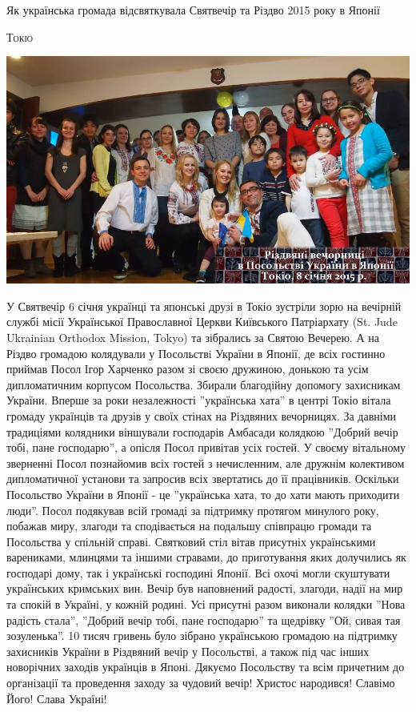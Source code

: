 \documentclass[10pt,a4paper]{article}
\newcommand{\NewsItem}[1]{%
		\usefont{T2A}{iwona}{m}{n} 
		\large #1 \vspace{4pt}
		\par \normalsize \normalfont}
\newcommand{\NewsAuthor}[1]{%
			\hfill \textsc{#1} \vspace{4pt}
			\par \normalfont}
\begin{document}
\begin{multicols}{3}
\vspace{1cm}
\NewsItem{Як українська громада відсвяткувала Святвечір та Різдво 2015 року в Японії}
\NewsAuthor{Токіо}
		\begin{center}
			\includegraphics[width=0.8\linewidth]{images/rizdvo}
		\end{center}
У Святвечір 6 січня українці та японські друзі в Токіо зустріли зорю на вечірній службі місії Української Православної Церкви Київського Патріархату (St. Jude Ukrainian Orthodox Mission, Tokyo) та зібрались за Святою Вечерею.
А на Різдво громадою колядували у Посольствi України в Японії, де всіх гостинно приймав Посол Ігор Харченко разом зі своєю дружиною, донькою та усім дипломатичним корпусом Посольства. Збирали благодійну допомогу захисникам України.
Вперше за роки незалежності ''українська хата'' в центрі Токіо вітала громаду українців та друзів у своїх стінах на Різдвяних вечорницях. За давніми традиціями колядники віншували господарів Амбасади колядкою ''Добрий вечір тобі, пане господарю'', а опісля Посол привітав усіх гостей.
У своєму вітальному зверненні Посол познайомив всіх гостей з нечисленним, але дружнім колективом дипломатичної установи та запросив всіх звертатись до її працівників. Оскільки Посольство України в Японії - це ''українська хата, то до хати мають приходити люди''. Посол подякував всій громаді за підтримку протягом минулого року, побажав миру, злагоди та сподівається на подальшу співпрацю громади та Посольства у спільній справі.
Святковий стіл вітав присутніх українськими варениками, млинцями та іншими стравами, до приготування яких долучились як господарі дому, так і українські господині Японії. Всі охочі могли скуштувати українських кримських вин.
Вечір був наповнений радості, злагоди, надії на мир та спокій в Україні, у кожній родині. Усі присутні разом виконали колядки ''Нова радість стала'', ''Добрий вечір тобі, пане господарю'' та щедрівку ''Ой, сивая тая зозуленька''.
10 тисяч гривень було зібрано українською громадою на підтримку захисників України в Різдвяний вечір у Посольстві, а також під час інших новорічних заходів українців в Японі.
Дякуємо Посольству та всім причетним до організації та проведення заходу за чудовий вечір!
Христос народився! Славімо Його!
Слава Україні!


\end{multicols}
\end{document}
